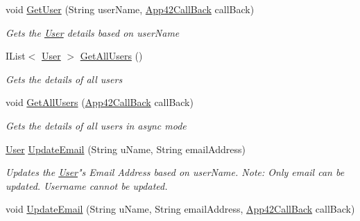 \begin{DoxyCompactItemize}
void \hyperlink{classcom_1_1shephertz_1_1app42_1_1paas_1_1sdk_1_1csharp_1_1user_1_1_user_service_a502ba67506ee1bc23f465e888c22eeb9}{Get\+User} (String user\+Name, \hyperlink{interfacecom_1_1shephertz_1_1app42_1_1paas_1_1sdk_1_1csharp_1_1_app42_call_back}{App42\+Call\+Back} call\+Back)
\begin{DoxyCompactList}\small\item\em Gets the \hyperlink{classcom_1_1shephertz_1_1app42_1_1paas_1_1sdk_1_1csharp_1_1user_1_1_user}{User} details based on user\+Name \end{DoxyCompactList}\item 
I\+List$<$ \hyperlink{classcom_1_1shephertz_1_1app42_1_1paas_1_1sdk_1_1csharp_1_1user_1_1_user}{User} $>$ \hyperlink{classcom_1_1shephertz_1_1app42_1_1paas_1_1sdk_1_1csharp_1_1user_1_1_user_service_a868eeeb3bba427a5f1c0c0094a9ec600}{Get\+All\+Users} ()
\begin{DoxyCompactList}\small\item\em Gets the details of all users \end{DoxyCompactList}\item 
void \hyperlink{classcom_1_1shephertz_1_1app42_1_1paas_1_1sdk_1_1csharp_1_1user_1_1_user_service_a3d241fe68096a35c5eb47d429a6b2a80}{Get\+All\+Users} (\hyperlink{interfacecom_1_1shephertz_1_1app42_1_1paas_1_1sdk_1_1csharp_1_1_app42_call_back}{App42\+Call\+Back} call\+Back)
\begin{DoxyCompactList}\small\item\em Gets the details of all users in async mode \end{DoxyCompactList}\item 
\hyperlink{classcom_1_1shephertz_1_1app42_1_1paas_1_1sdk_1_1csharp_1_1user_1_1_user}{User} \hyperlink{classcom_1_1shephertz_1_1app42_1_1paas_1_1sdk_1_1csharp_1_1user_1_1_user_service_aba9bdc67447603deb6de6f4ff1a09c2e}{Update\+Email} (String u\+Name, String email\+Address)
\begin{DoxyCompactList}\small\item\em Updates the \hyperlink{classcom_1_1shephertz_1_1app42_1_1paas_1_1sdk_1_1csharp_1_1user_1_1_user}{User}"s Email Address based on user\+Name. Note\+: Only email can be updated. Username cannot be updated. \end{DoxyCompactList}\item 
void \hyperlink{classcom_1_1shephertz_1_1app42_1_1paas_1_1sdk_1_1csharp_1_1user_1_1_user_service_afc7cdc5dbd4a45ac654764f5fe0b6e78}{Update\+Email} (String u\+Name, String email\+Address, \hyperlink{interfacecom_1_1shephertz_1_1app42_1_1paas_1_1sdk_1_1csharp_1_1_app42_call_back}{App42\+Call\+Back} call\+Back)

\end{DoxyCompactItemize}
